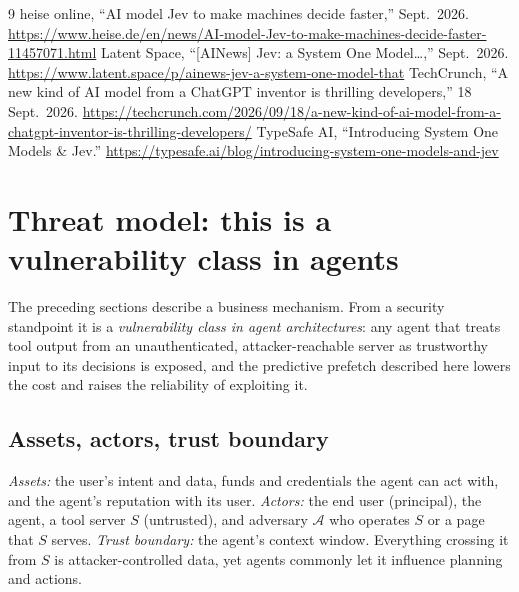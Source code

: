\documentclass[11pt]{article}
\begin{document}
\begin{thebibliography}{9}
 heise online, ``AI model Jev to make machines decide faster,'' Sept.\ 2026.
  \url{https://www.heise.de/en/news/AI-model-Jev-to-make-machines-decide-faster-11457071.html}
 Latent Space, ``[AINews] Jev: a System One Model\dots,'' Sept.\ 2026.
  \url{https://www.latent.space/p/ainews-jev-a-system-one-model-that}
 TechCrunch, ``A new kind of AI model from a ChatGPT inventor is thrilling developers,'' 18 Sept.\ 2026.
  \url{https://techcrunch.com/2026/09/18/a-new-kind-of-ai-model-from-a-chatgpt-inventor-is-thrilling-developers/}
 TypeSafe AI, ``Introducing System One Models \& Jev.''
  \url{https://typesafe.ai/blog/introducing-system-one-models-and-jev}
\end{thebibliography}

\section{Threat model: this is a vulnerability class in agents}
The preceding sections describe a business mechanism. From a security standpoint it is a
\emph{vulnerability class in agent architectures}: any agent that treats tool output from an
unauthenticated, attacker-reachable server as trustworthy input to its decisions is exposed, and the
predictive prefetch described here lowers the cost and raises the reliability of exploiting it.

\subsection{Assets, actors, trust boundary}
\emph{Assets:} the user's intent and data, funds and credentials the agent can act with, and the agent's
reputation with its user. \emph{Actors:} the end user (principal), the agent, a tool server $S$
(untrusted), and adversary $\mathcal A$ who operates $S$ or a page that $S$ serves. \emph{Trust boundary:}
the agent's context window. Everything crossing it from $S$ is attacker-controlled data, yet agents commonly
let it influence planning and actions.
\end{document}
